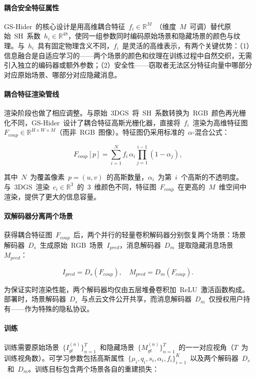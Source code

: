 \paragraph{耦合安全特征属性}GS-Hider~的核心设计是用高维耦合特征~$f_i \in \mathbb{R}^M$~（维度~$M$~可调）替代原始~SH~系数~$h_i \in \mathbb{R}^{48}$，使同一组参数同时编码原始场景和隐藏场景的颜色与纹理。与~$h_i$~具有固定物理含义不同，$f_i$~是灵活的高维表示，有两个关键优势：（1）信息融合是自适应学习的——两个场景的颜色和纹理在训练过程中自然交织，无需引入独立的编码器或额外参数；（2）安全性——窃取者无法区分特征向量中哪部分对应原始场景、哪部分对应隐藏消息。

\paragraph{耦合特征渲染管线}渲染阶段也做了相应调整。与原始~3DGS~将~SH~系数转换为~RGB~颜色再光栅化不同，GS-Hider~设计了耦合特征高斯光栅化器，直接将~$f_i$~渲染为高维特征图~$F_{coup} \in \mathbb{R}^{H \times W \times M}$（而非~RGB~图像）。特征图仍采用标准的~$\alpha$-混合公式：

\begin{equation}
    F_{coup}[p] = \sum_{i=1}^{N} f_i \, \alpha_i \prod_{j=1}^{i-1}(1-\alpha_j),
\end{equation}

其中~$N$~为覆盖像素~$p=(u,v)$~的高斯数量，$\alpha_i$~为第~$i$~个高斯的不透明度。与~3DGS~渲染~$c_i \in \mathbb{R}^3$~的~3~维颜色不同，特征图~$F_{coup}$~在更高的~$M$~维空间中渲染，提供了更大的信息容量。

\paragraph{双解码器分离两个场景}获得耦合特征图~$F_{coup}$~后，两个并行的轻量卷积解码器分别恢复两个场景：场景解码器~$D_s$~生成原始~RGB~场景~$I_{pred}$，消息解码器~$D_m$~提取隐藏消息场景~$M_{pred}$：

\begin{equation}
    I_{pred} = D_s(F_{coup}), \quad M_{pred} = D_m(F_{coup}).
\end{equation}

为保证实时渲染性能，两个解码器均仅由五层堆叠卷积加~ReLU~激活函数构成。部署时，场景解码器~$D_s$~与点云文件公开共享，而消息解码器~$D_m$~仅授权用户持有——作为特殊的隐私协议。

\paragraph{训练}训练需要原始场景~$\{I^{(n)}_{gt}\}_{n=1}^T$~和隐藏场景~$\{M^{(n)}_{gt}\}_{n=1}^T$~的一一对应视角（$T$~为训练视角数）。可学习参数包括高斯属性~$\{\mu_i, q_i, s_i, \alpha_i, f_i\}_{i=1}^K$~以及两个解码器~$D_s$~和~$D_m$。训练目标包含两个场景各自的重建损失：

